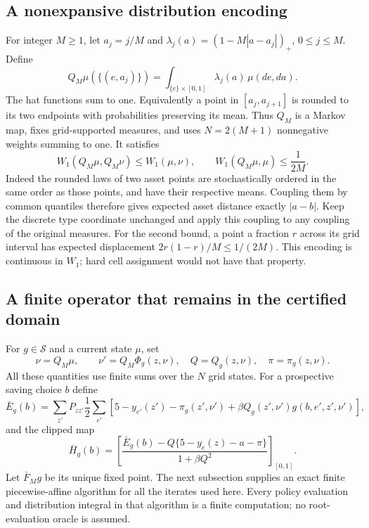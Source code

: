 \documentclass[11pt,a4paper]{article}
\begin{document}
\subsection{A nonexpansive distribution encoding}
For integer $M\geq1$, let $a_j=j/M$ and
$\lambda_j(a)=(1-M|a-a_j|)_+$, $0\leq j\leq M$. Define
\[
 Q_M\mu(\{(e,a_j)\})=\int_{\{e\}\times[0,1]}\lambda_j(a)\,\mu(de,da).
 \tag{S2}
\]
The hat functions sum to one. Equivalently a point in
$[a_j,a_{j+1}]$ is rounded to its two endpoints with probabilities
preserving its mean. Thus $Q_M$ is a Markov map, fixes grid-supported
measures, and uses $N=2(M+1)$ nonnegative weights summing to one.
It satisfies
\[
 W_1(Q_M\mu,Q_M\nu)\leq W_1(\mu,\nu),\qquad
 W_1(Q_M\mu,\mu)\leq\frac1{2M}.
 \tag{S3}
\]
Indeed the rounded laws of two asset points are stochastically ordered
in the same order as those points, and have their respective means.
Coupling them by common quantiles therefore gives expected asset
distance exactly $|a-b|$. Keep the discrete type coordinate unchanged
and apply this coupling to any coupling of the original measures.
For the second bound, a point a fraction $r$ across its grid interval
has expected displacement $2r(1-r)/M\leq1/(2M)$.
This encoding is continuous in $W_1$; hard cell assignment would not
have that property.

\subsection{A finite operator that remains in the certified domain}
For $g\in\mathcal S$ and a current state $\mu$, set
\[
 \nu=Q_M\mu,\qquad
 \nu'=Q_M\Phi_g(z,\nu),\quad
 Q=Q_g(z,\nu),\quad \pi=\pi_g(z,\nu).
 \tag{S4}
\]
All these quantities use finite sums over the $N$ grid states.
For a prospective saving choice $b$ define
\[
 \bar E_g(b)=
 \sum_{z'}P_{zz'}\frac12\sum_{e'}
 \left[5-y_{e'}(z')-\pi_g(z',\nu')
       +\beta Q_g(z',\nu')g(b,e',z',\nu')\right],
 \tag{S5}
\]
and the clipped map
\[
 \bar H_g(b)=
 \left[\frac{\bar E_g(b)-Q\{5-y_e(z)-a-\pi\}}
 {1+\beta Q^2}\right]_{[0,1]}.
 \tag{S6}
\]
Let $\bar F_Mg$ be its unique fixed point. The next subsection supplies
an exact finite piecewise-affine algorithm for all the iterates used
here. Every policy evaluation and distribution integral in that
algorithm is a finite computation; no root-evaluation oracle is assumed.
\end{document}

